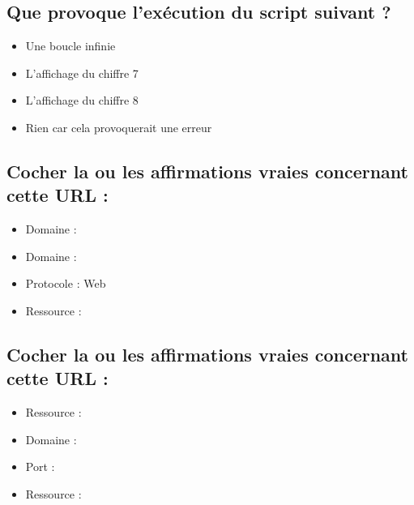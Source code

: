 \documentclass[11pt,a4paper]{article}
\begin{document}
\subsection{Que provoque l'exécution du script suivant ?}


\bigskip

\begin{itemize}
\item[\CaseCoche] Une boucle infinie \\
\item[\CaseCoche] L'affichage du chiffre 7 \\
\item[\CaseCoche] L'affichage du chiffre 8 \\
\item[\CaseCoche] Rien car cela provoquerait une erreur \\
\end{itemize}


\subsection{Cocher la ou les affirmations vraies concernant cette URL :}


\bigskip

\begin{itemize}
\item[\CaseCoche] Domaine :  \\
\item[\CaseCoche] Domaine :  \\
\item[\CaseCoche] Protocole : Web \\
\item[\CaseCoche] Ressource :  \\
\end{itemize}


\subsection{Cocher la ou les affirmations vraies concernant cette URL :}


\bigskip

\begin{itemize}
\item[\CaseCoche] Ressource :  \\
\item[\CaseCoche] Domaine :  \\
\item[\CaseCoche] Port :  \\
\item[\CaseCoche] Ressource :  \\
\end{itemize}
\end{document}
